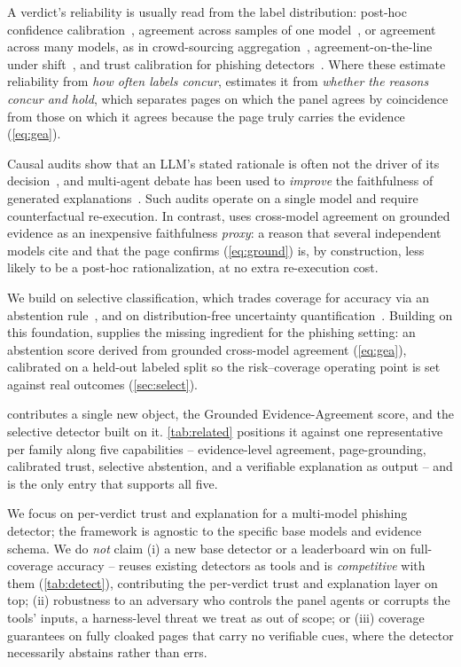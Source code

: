 A verdict's reliability is usually read from the label distribution: post-hoc
confidence calibration~\cite{guo2017calibration}, agreement across samples of one
model~\cite{wang2023selfconsistency}, or agreement across many models, as in
crowd-sourcing aggregation~\cite{dawid1979maximum}, agreement-on-the-line under
shift~\cite{baek2022agreement}, and trust calibration for phishing
detectors~\cite{tci2025}. Where these estimate reliability from \emph{how often
labels concur}, \toolname{} estimates it from \emph{whether the reasons concur and
hold}, which separates pages on which the panel agrees by coincidence from those on
which it agrees because the page truly carries the evidence (\eqref{eq:gea}).

Causal audits show that an LLM's stated rationale is often not the driver of its
decision~\cite{ariadne2026}, and multi-agent debate has been used to \emph{improve}
the faithfulness of generated explanations~\cite{madr2024}. Such audits operate on
a single model and require counterfactual re-execution. In contrast, \toolname{}
uses cross-model agreement on grounded evidence as an inexpensive faithfulness
\emph{proxy}: a reason that several independent models cite and that the page
confirms (\eqref{eq:ground}) is, by construction, less likely to be a post-hoc
rationalization, at no extra re-execution cost.

We build on selective classification, which trades coverage for accuracy via an
abstention rule~\cite{geifman2017selective}, and on distribution-free uncertainty
quantification~\cite{vovk2005algorithmic}. Building on this foundation,
\toolname{} supplies the missing ingredient for the phishing setting: an
abstention score derived from grounded cross-model agreement (\eqref{eq:gea}),
calibrated on a held-out labeled split so the risk--coverage operating point is set
against real outcomes (\autoref{sec:select}).

\toolname{} contributes a single new object, the Grounded Evidence-Agreement
score, and the selective detector built on it. \autoref{tab:related} positions it
against one representative per family along five capabilities -- evidence-level
agreement, page-grounding, calibrated trust, selective abstention, and a
verifiable explanation as output -- and \toolname{} is the only entry that
supports all five.

We focus on per-verdict trust and explanation for a multi-model
phishing detector; the framework is agnostic to the specific base models and
evidence schema. We do \emph{not} claim (i) a new base
detector or a leaderboard win on full-coverage accuracy -- \toolname{} reuses existing
detectors as tools and is \emph{competitive} with them (\autoref{tab:detect}),
contributing the per-verdict trust and explanation layer on top; (ii) robustness to an
adversary who controls the panel agents or corrupts the tools' inputs, a
harness-level threat we treat as out of scope; or (iii) coverage guarantees on
fully cloaked pages that carry no verifiable cues, where the
detector necessarily abstains rather than errs.
